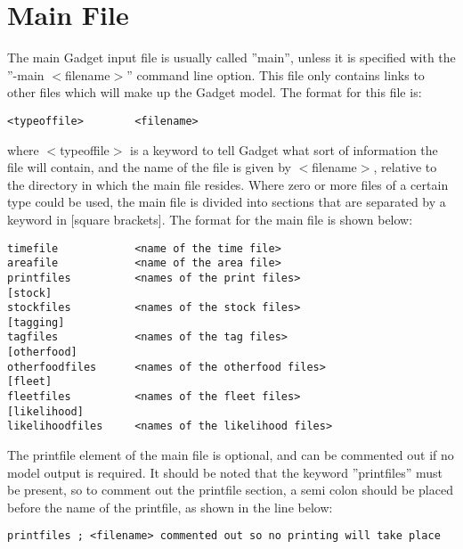 \documentclass [a4paper, 10pt]{book}
\begin{document}
\section{Main File}\label{sec:mainfile}
The main Gadget input file is usually called ''main'', unless it is specified with the ''-main $<$filename$>$'' command line option.  This file only contains links to other files which will make up the Gadget model.  The format for this file is:

{\small\begin{verbatim}
<typeoffile>        <filename>
\end{verbatim}}

where $<$typeoffile$>$ is a keyword to tell Gadget what sort of information the file will contain, and the name of the file is given by $<$filename$>$, relative to the directory in which the main file resides.  Where zero or more files of a certain type could be used, the main file is divided into sections that are separated by a keyword in [square brackets].  The format for the main file is shown below:

{\small\begin{verbatim}
timefile            <name of the time file>
areafile            <name of the area file>
printfiles          <names of the print files>
[stock]
stockfiles          <names of the stock files>
[tagging]
tagfiles            <names of the tag files>
[otherfood]
otherfoodfiles      <names of the otherfood files>
[fleet]
fleetfiles          <names of the fleet files>
[likelihood]
likelihoodfiles     <names of the likelihood files>
\end{verbatim}}


The printfile element of the main file is optional, and can be commented out if no model output is required.  It should be noted that the keyword ''printfiles'' must be present, so to comment out the printfile section, a semi colon should be placed before the name of the printfile, as shown in the line below:

{\small\begin{verbatim}
printfiles ; <filename> commented out so no printing will take place
\end{verbatim}}
\end{document}
